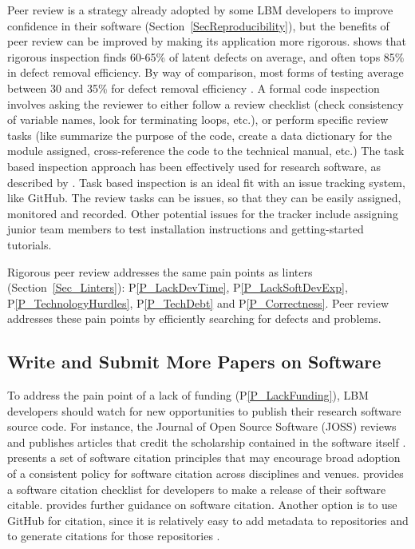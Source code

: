 \documentclass[final, 3p, times, authoryear]{elsarticle}
\newcommand{\ppref}[1]{P\ref{#1}}
\begin{document}
Peer review is a strategy already adopted by some LBM developers to improve
confidence in their software (Section~\ref{SecReproducibility}), but the
benefits of peer review can be improved by making its application more rigorous.
\citet{Jones2008} shows that rigorous inspection finds 60-65\% of latent defects
on average, and often tops 85\% in defect removal efficiency.  By way of
comparison, most forms of testing average between 30 and 35\% for defect removal
efficiency \citep{EbertAndJones2009, Jones2008}.  A formal code inspection
involves asking the reviewer to either follow a review checklist (check
consistency of variable names, look for terminating loops, etc.), or perform
specific review tasks (like summarize the purpose of the code, create a data
dictionary for the module assigned, cross-reference the code to the technical
manual, etc.) The task based inspection approach has been effectively used for
research software, as described by \citet{KellyAndShepard2000}. Task based
inspection is an ideal fit with an issue tracking system, like GitHub.  The
review tasks can be issues, so that they can be easily assigned, monitored and
recorded.  Other potential issues for the tracker include assigning junior team
members to test installation instructions and getting-started tutorials.

Rigorous peer review addresses the same pain points as linters
(Section~\ref{Sec_Linters}): \ppref{P_LackDevTime}, \ppref{P_LackSoftDevExp},
\ppref{P_TechnologyHurdles}, \ppref{P_TechDebt} and \ppref{P_Correctness}. Peer
review addresses these pain points by efficiently searching for defects and
problems.

\subsection{Write and Submit More Papers on Software} \label{Sec_MorePapers}

To address the pain point of a lack of funding (\ppref{P_LackFunding}), LBM
developers should watch for new opportunities to publish their research software
source code. For instance, the Journal of Open Source Software (JOSS) reviews
and publishes articles that credit the scholarship contained in the software
itself \citep{SmithEtAl2018-joss}.  \citet{SmithEtAl2016-softcite} presents a
set of software citation principles that may encourage broad adoption of a
consistent policy for software citation across disciplines and venues.
\citet{ChueHongEtAl2019} provides a software citation checklist for developers
to make a release of their software citable.  \citet{KatzEtAl2021} provides
further guidance on software citation.  Another option is to use GitHub for
citation, since it is relatively easy to add metadata to repositories and to
generate citations for those repositories \citet{Smith2021-CitationsOnGitHub}.
\end{document}

